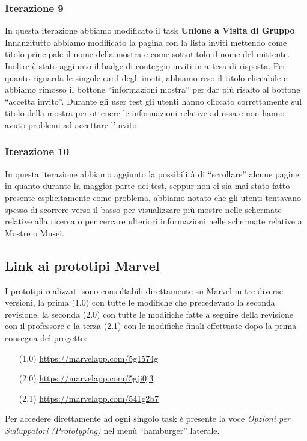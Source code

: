 \subsubsection{Iterazione 9}
In questa iterazione abbiamo modificato il task \textbf{Unione a Visita di Gruppo}. Innanzitutto abbiamo modificato la pagina con la lista inviti mettendo come titolo principale il nome della mostra e come sottotitolo il nome del mittente. Inoltre è stato aggiunto il badge di conteggio inviti in attesa di risposta. Per quanto riguarda le singole card degli inviti, abbiamo reso il titolo cliccabile e abbiamo rimosso il bottone ``informazioni mostra'' per dar più risalto al bottone ``accetta invito''. Durante gli user test gli utenti hanno cliccato correttamente sul titolo della mostra per ottenere le informazioni relative ad essa e non hanno avuto problemi ad accettare l'invito.

\subsubsection{Iterazione 10}
In questa iterazione abbiamo aggiunto la possibilità di ``scrollare'' alcune pagine in quanto durante la maggior parte dei test, seppur non ci sia mai stato fatto presente esplicitamente come problema, abbiamo notato che gli utenti tentavano spesso di scorrere verso il basso per visualizzare più mostre nelle schermate relative alla ricerca o per cercare ulteriori informazioni nelle schermate relative a Mostre o Musei.

\subsection{Link ai prototipi Marvel}
I prototipi realizzati sono consultabili direttamente su Marvel in tre diverse versioni, la prima (1.0) con tutte le modifiche che precedevano la seconda revisione, la seconda (2.0) con tutte le modifiche fatte a seguire della revisione con il professore e la terza (2.1) con le modifiche finali effettuate dopo la prima consegna del progetto:
\begin{enumerate}
    \item[(1.0)] \url{https://marvelapp.com/5g1574g}
    \item[(2.0)] \url{https://marvelapp.com/5gji0j3}
    \item[(2.1)] \url{https://marvelapp.com/541g2b7}
\end{enumerate}

Per accedere direttamente ad ogni singolo task è presente la voce \textit{Opzioni per Sviluppatori (Prototyping)} nel menù ``hamburger'' laterale.
